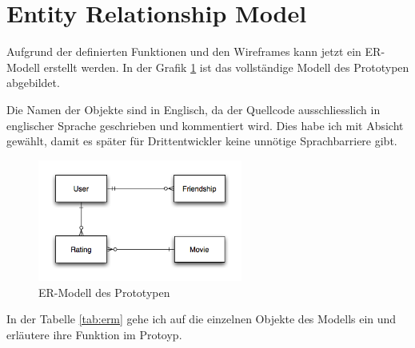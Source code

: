 \clearpage

\section{Entity Relationship Model}
Aufgrund der definierten Funktionen und den Wireframes kann jetzt ein ER-Modell
erstellt werden. In der Grafik \ref{erm} ist das vollständige Modell des Prototypen
abgebildet.

Die Namen der Objekte sind in Englisch, da der Quellcode ausschliesslich in englischer 
Sprache geschrieben und kommentiert wird. Dies habe ich mit Absicht gewählt, 
damit es später für Drittentwickler keine unnötige Sprachbarriere gibt.

\begin{figure}[ht]
    \begin{center}
        \includegraphics[width=0.6\textwidth,angle=0]{./erm/erm.png}
        \caption{ER-Modell des Prototypen}
        \label{erm}
    \end{center}
\end{figure}

In der Tabelle \ref{tab:erm} gehe ich auf die einzelnen Objekte des Modells ein
und erläutere ihre Funktion im Protoyp.

